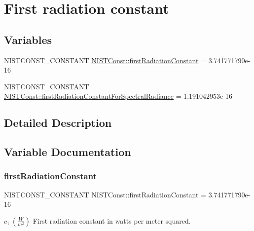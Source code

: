 \hypertarget{group___n_i_s_t_const-_first_radiation_constant}{}\section{First radiation constant}
\label{group___n_i_s_t_const-_first_radiation_constant}
\subsection*{Variables}
\begin{DoxyCompactItemize}
\item 
N\+I\+S\+T\+C\+O\+N\+S\+T\+\_\+\+C\+O\+N\+S\+T\+A\+NT \mbox{\hyperlink{group___n_i_s_t_const-_first_radiation_constant_ga53183115e6a2d5cf5afc624f247f3698}{N\+I\+S\+T\+Const\+::first\+Radiation\+Constant}} = 3.\+741771790e-\/16
\item 
N\+I\+S\+T\+C\+O\+N\+S\+T\+\_\+\+C\+O\+N\+S\+T\+A\+NT \mbox{\hyperlink{group___n_i_s_t_const-_first_radiation_constant_ga350d484e55bd7af5e00f59d5ed64d43b}{N\+I\+S\+T\+Const\+::first\+Radiation\+Constant\+For\+Spectral\+Radiance}} = 1.\+191042953e-\/16
\end{DoxyCompactItemize}


\subsection{Detailed Description}


\subsection{Variable Documentation}
\mbox{\label{group___n_i_s_t_const-_first_radiation_constant_ga53183115e6a2d5cf5afc624f247f3698}} 
\subsubsection{\texorpdfstring{first\+Radiation\+Constant}{firstRadiationConstant}}
{\footnotesize\ttfamily N\+I\+S\+T\+C\+O\+N\+S\+T\+\_\+\+C\+O\+N\+S\+T\+A\+NT N\+I\+S\+T\+Const\+::first\+Radiation\+Constant = 3.\+741771790e-\/16}

$c_1 \ (\frac{W}{m^2})$ First radiation constant in watts per meter squared. \mbox{\label{group___n_i_s_t_const-_first_radiation_constant_ga350d484e55bd7af5e00f59d5ed64d43b}} 
